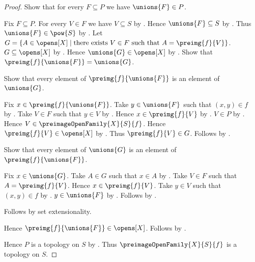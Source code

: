 \begin{proof}
    Show that for every $F\subseteq P$ we have $\unions{F}\in P$.
    \begin{subproof}
        Fix $F\subseteq P$.
        For every $V\in F$ we have $V\subseteq S$ by
            .
        Hence $\unions{F}\subseteq S$ by .
        Thus $\unions{F}\in\pow{S}$ by .
        Let $G=\{A\in\opens[X]\mid
            \text{there exists $V\in F$ such that
                $A=\preimg{f}{V}$}\}$.
        $G\subseteq\opens[X]$ by .
        Hence $\unions{G}\in\opens[X]$ by .
        Show that $\preimg{f}{\unions{F}}=\unions{G}$.
        \begin{subproof}
            Show that every element of $\preimg{f}{\unions{F}}$ is an
                element of $\unions{G}$.
            \begin{subproof}
                Fix $x\in\preimg{f}{\unions{F}}$.
                Take $y\in\unions{F}$ such that $(x,y)\in f$ by
                    .
                Take $V\in F$ such that $y\in V$ by .
                Hence $x\in\preimg{f}{V}$ by .
                $V\in P$ by .
                Hence $V\in\preimageOpenFamily{X}{S}{f}$.
                Hence $\preimg{f}{V}\in\opens[X]$ by
                    .
                Thus $\preimg{f}{V}\in G$.
                Follows by .
            \end{subproof}
            Show that every element of $\unions{G}$ is an element of
                $\preimg{f}{\unions{F}}$.
            \begin{subproof}
                Fix $x\in\unions{G}$.
                Take $A\in G$ such that $x\in A$ by .
                Take $V\in F$ such that $A=\preimg{f}{V}$.
                Hence $x\in\preimg{f}{V}$.
                Take $y\in V$ such that $(x,y)\in f$ by
                    .
                $y\in\unions{F}$ by .
                Follows by .
            \end{subproof}
            Follows by set extensionality.
        \end{subproof}
        Hence $\preimg{f}{\unions{F}}\in\opens[X]$.
        Follows by .
    \end{subproof}
    Hence $P$ is a topology on $S$ by .
    Thus $\preimageOpenFamily{X}{S}{f}$ is a topology on $S$.
\end{proof}

